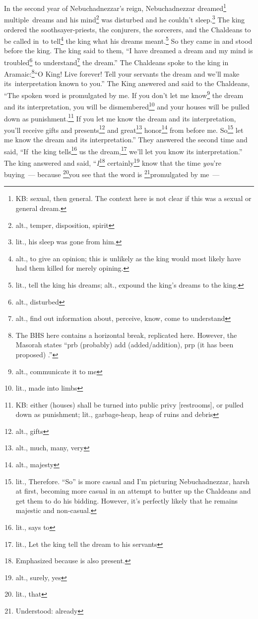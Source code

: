 
\begin{inparaenum}
     In the second year of Nebuchadnezzar's reign, Nebuchadnezzar dreamed\footnote{KB: sexual, then general. The context here is not clear if this was a sexual or general dream.} multiple\understood\ dreams and his mind\footnote{alt., temper, disposition, spirit} was disturbed and he couldn't sleep.\footnote{lit., his sleep was gone from him.}%
     The king ordered the soothsayer-priests, the conjurers, the sorcerers, and the Chaldeans to be called in\understood\ to tell\footnote{alt., to give an opinion; this is unlikely as the king would most likely have had them killed for merely opining.} the king what his dreams meant.\footnote{lit., tell the king his dreams; alt., expound the king's dreams to the king.} So they came in and stood before the king.%
     The king said to them, ``I have dreamed a dream and my mind is troubled\footnote{alt., disturbed} to understand\footnote{alt., find out information about, perceive, know, come to understand} the dream.''%
     The Chaldeans spoke to the king in Aramaic:\footnote{The BHS here contains a horizontal break, replicated here. However, the Masorah states ``prb (probably) add (added/addition), prp (it has been proposed) .''}\hspace*{4em}``O King! Live forever! Tell your servants the dream and we'll make its\understood\ interpretation known to you.''%
     The King answered and said to the Chaldeans, ``The spoken word is promulgated by me. If you don't let me know\footnote{alt., communicate it to me} the dream and its interpretation, you will be dismembered\footnote{lit., made into limbs} and your houses will be pulled down as punishment.\footnote{KB: either (houses) shall be turned into public privy [restrooms], or pulled down as punishment; lit., garbage-heap, heap of ruins and debris}%
     If you let me know the dream and its interpretation, you'll receive gifts and presents\footnote{alt., gifts} and great\footnote{alt., much, many, very} honor\footnote{alt., majesty} from before me. So\footnote{lit., Therefore. ``So'' is more casual and I'm picturing Nebuchadnezzar, harsh at first, becoming more casual in an attempt to butter up the Chaldeans and get them to do his bidding. However, it's perfectly likely that he remains majestic and non-casual.} let me know the dream and its interpretation.''%
     They answered the second time and said, ``If\understood\ the king tells\footnote{lit., says to} us the dream,\footnote{lit., Let the king tell the dream to his servants} we'll let you know its interpretation.''%
     The king answered and said, ``\emph{I}\footnote{Emphasized because  is also present.} certainly\footnote{alt., surely, yes} know that the time \emph{you}'re buying~--- because \footnote{lit., that}you see that the word is \footnote{Understood: already}promulgated by me~---%
    

\end{inparaenum}
